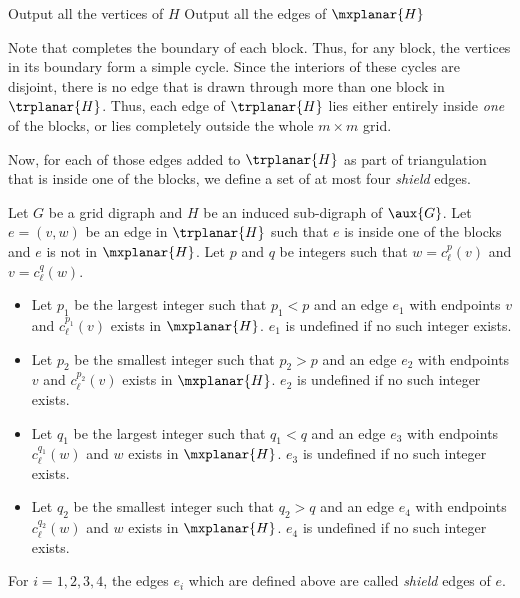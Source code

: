 \documentclass{toc}
\begin{document}
\begin{algorithm}
\LinesNumbered
\caption{Completing the boundary of $\mxplanar{H}$}
\label{alg:completeboundary}
%

Output all the vertices of $H$\;
Output all the edges of $\mxplanar{H}$\;
\end{algorithm}

Note that  completes the boundary of each block. Thus, for any block, the vertices in its boundary form a simple cycle. Since the interiors of these cycles are disjoint, there is no edge that is drawn through more than one block in $\trplanar{H}$. Thus, each edge of $\trplanar{H}$ %
lies  %
either entirely inside \emph{one} of the blocks, or
%
lies  %
completely outside the whole $m \times m$ grid.

Now, for each of those edges added to $\trplanar{H}$ as part of triangulation that is inside one of the blocks, we define a set of at most four \emph{shield} edges.

\begin{definition}Let $G$ be a grid %
digraph %
 and $H$ be %
an induced  %
sub-digraph %
 of $\aux{G}$. Let $e = (v, w)$ be an edge in $\trplanar{H}$ such that $e$ is inside one of the blocks and $e$ is not %
 in $\mxplanar{H}$. Let $p$ and $q$ be integers such that $w = c_{\ell}^{p}(v)$ and $v = c_{\ell}^q(w)$.

\begin{itemize}
\item Let $p_1$ be the largest integer such that $p_1 < p$ and an edge $e_1$ with endpoints $v$ and $c_{\ell}^{p_1}(v)$ exists in $\mxplanar{H}$. $e_1$ is undefined if no such integer exists.
\item Let $p_2$ be the smallest integer such that $p_2 > p$ and an edge $e_2$ with endpoints $v$ and $c_{\ell}^{p_2}(v)$ exists in $\mxplanar{H}$. $e_2$ is undefined if no such integer exists.
\item Let $q_1$ be the largest integer such that $q_1 < q$ and an edge $e_3$ with endpoints $c_{\ell}^{q_1}(w)$ and $w$ exists in $\mxplanar{H}$. $e_3$ is undefined if no such integer exists.
\item Let $q_2$ be the smallest integer such that $q_2 > q$ and an edge $e_4$ with endpoints $c_{\ell}^{q_2}(w)$ and $w$ exists in $\mxplanar{H}$. $e_4$ is undefined if no such integer exists.
\end{itemize}
For $i = 1,2,3,4$, the edges $e_i$ which are defined above are called \emph{shield} edges of $e$.
\end{definition}
\end{document}
